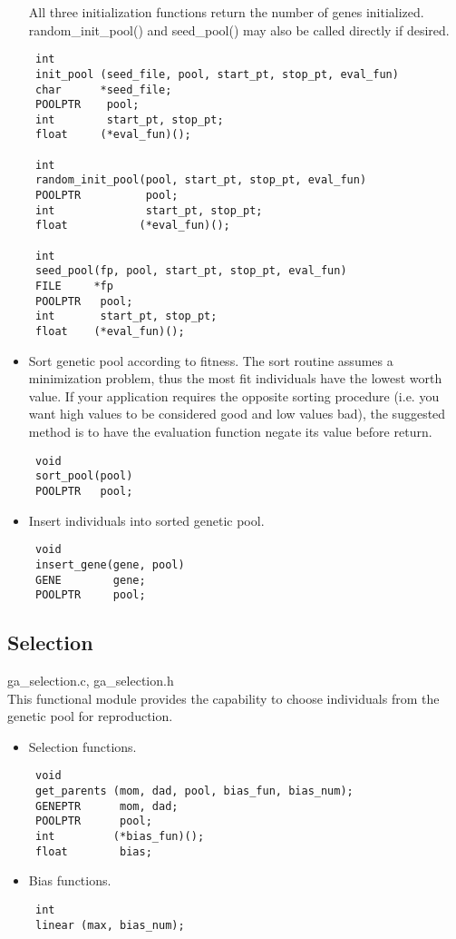 \begin{itemize}
All three initialization functions return the number of genes initialized.
random\_init\_pool() and seed\_pool() may also be called directly if desired.
\begin{verbatim}
 int
 init_pool (seed_file, pool, start_pt, stop_pt, eval_fun)
 char      *seed_file;
 POOLPTR    pool;
 int        start_pt, stop_pt;
 float     (*eval_fun)();

 int
 random_init_pool(pool, start_pt, stop_pt, eval_fun)
 POOLPTR          pool;
 int              start_pt, stop_pt;
 float           (*eval_fun)();

 int
 seed_pool(fp, pool, start_pt, stop_pt, eval_fun)
 FILE     *fp
 POOLPTR   pool;
 int       start_pt, stop_pt;
 float    (*eval_fun)();
\end{verbatim}

\item Sort genetic pool according to fitness.  The sort routine
assumes a minimization problem, thus the most fit individuals have
the lowest worth value.  If your application requires the opposite
sorting procedure (i.e. you want high values to be considered good
and low values bad), the suggested method is to have the evaluation
function negate its value before return.
\begin{verbatim}
 void
 sort_pool(pool)
 POOLPTR   pool;
\end{verbatim}

\item Insert individuals into sorted genetic pool.
\begin{verbatim}
 void
 insert_gene(gene, pool)
 GENE        gene;
 POOLPTR     pool;
\end{verbatim}
\end{itemize}

\subsection{Selection}

ga\_selection.c, ga\_selection.h
\\
This functional module provides the capability to choose individuals
from the genetic pool for reproduction.

\begin{itemize}
\item Selection functions.
\begin{verbatim}
 void 
 get_parents (mom, dad, pool, bias_fun, bias_num);
 GENEPTR      mom, dad;
 POOLPTR      pool;
 int         (*bias_fun)();
 float        bias;
\end{verbatim}
\item Bias functions.
\begin{verbatim}
 int
 linear (max, bias_num);
\end{verbatim}
\end{itemize}


